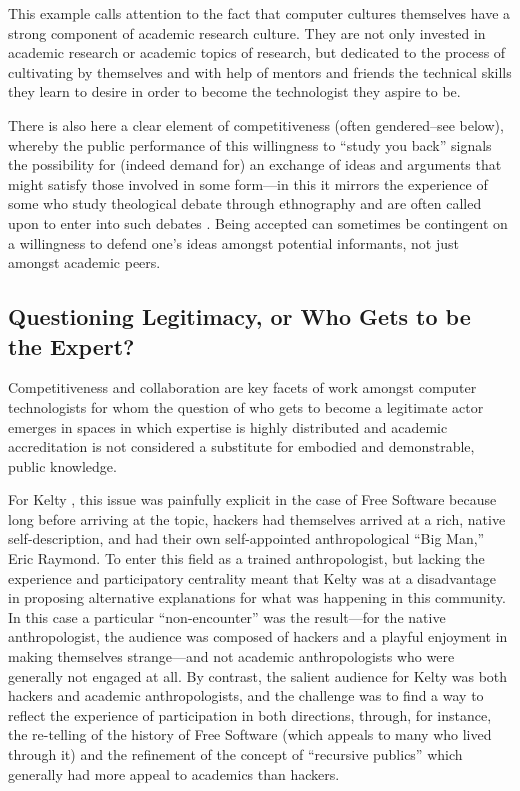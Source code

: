 \documentclass[10pt,letter,oneside]{scrartcl}
\begin{document}
This example calls attention to the fact that computer cultures
themselves have a strong component of academic research culture. They
are not only invested in academic research or academic topics of
research, but dedicated to the process of cultivating by themselves and 
with help of mentors and friends the technical skills they learn to desire
in order to become the technologist they aspire to be. 

There is also here a clear element of competitiveness (often
gendered--see below), whereby the public performance of this
willingness to ``study you back'' signals the possibility for (indeed
demand for) an exchange of ideas and arguments that might satisfy
those involved in some form---in this it mirrors the experience of
some who study theological debate through ethnography and are often
called upon to enter into such debates
\cite{Fischer1990,Harding2001,Crapanzano1980,Hirschkind2006}.  Being
accepted can sometimes be contingent on a willingness to defend one's
ideas amongst potential informants, not just amongst academic peers.

\subsection*{Questioning Legitimacy, or Who Gets to be the Expert?}

Competitiveness and collaboration are key facets of work amongst
computer technologists for whom the question of who gets to become a
legitimate actor emerges in spaces in which expertise is highly
distributed and academic accreditation is not considered a substitute
for embodied and demonstrable, public knowledge.

For Kelty \cite{Kelty2008}, this issue was painfully explicit in the
case of Free Software because long before arriving at the topic,
hackers had themselves arrived at a rich, native self-description, and
had their own self-appointed anthropological ``Big Man,'' Eric Raymond.
To enter this field as a trained anthropologist, but lacking the
experience and participatory centrality meant that Kelty was at a
disadvantage in proposing alternative explanations for what was
happening in this community.  In this case a particular
``non-encounter'' was the result---for the native anthropologist, the
audience was composed of hackers and a playful enjoyment in making
themselves strange---and not academic anthropologists who were
generally not engaged at all.  By contrast, the salient audience for
Kelty was both hackers and academic anthropologists, and the challenge
was to find a way to reflect the experience of participation in both
directions, through, for instance, the re-telling of the history of
Free Software (which appeals to many who lived through it) and the
refinement of the concept of ``recursive publics'' which generally had
more appeal to academics than hackers.
\end{document}
